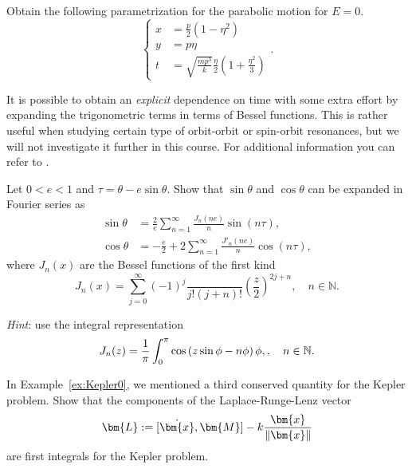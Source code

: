 \documentclass[english,fontsize=11pt,paper=a5,oneside]{scrbook}
\newcommand{\N}{\mathbb{N}}
\newcommand{\bx}{\bm{x}}
\let\d\relax
\DeclareMathOperator{\d}{d}
\theoremstyle{definition}
\newenvironment{exercise}
  {\pushQED{\qed}\renewcommand{\qedsymbol}{$\maltese$}\exercisex}
  {\popQED\endexercisex}
\begin{document}
\begin{exercise}
    Obtain the following parametrization for the parabolic motion for $E=0$.
    \begin{equation}
        \left\lbrace
        \begin{aligned}
            x &= \frac p2 \left(1- \eta^2\right)\\
            y &= p\eta\\
            t &= \sqrt{\frac{mp^3}k}\frac\eta2\left(1+\frac{\eta^2}3\right)
        \end{aligned}
        \right..
    \end{equation}
\end{exercise}

It is possible to obtain an \emph{explicit} dependence on time with some extra effort by expanding the trigonometric terms in terms of Bessel functions. This is rather useful when studying certain type of orbit-orbit or spin-orbit resonances, but we will not investigate it further in this course. For additional information you can refer to \cite{book:arnoldcelestial, book:celletti}.

\begin{exercise}
    Let $0<e<1$ and $\tau = \theta - e\sin\theta$.
    Show that $\sin\theta$ and $\cos\theta$ can be expanded in Fourier series as
    \begin{align}
        \sin\theta &= \frac2e \sum_{n=1}^\infty \frac{J_n(ne)}{n} \sin(n\tau),\\
        \cos\theta &= -\frac e2 + 2 \sum_{n=1}^\infty \frac{J'_n(ne)}{n} \cos(n\tau),
    \end{align}
    where $J_n(x)$ are the Bessel functions of the first kind 
    \begin{equation}
        J_n(x) = \sum_{j=0}^\infty (-1)^j\frac{}{j!(j+n)!}\left(\frac z2\right)^{2j+n}, \quad n\in\N.
    \end{equation}

    \emph{Hint}: use the integral representation
    \begin{equation}
        J_n(z) = \frac1\pi \int_0^\pi \cos\left(z\sin\phi - n \phi\right)\d\phi,, \quad n\in\N.
    \end{equation}
\end{exercise}

In Example~\ref{ex:Kepler0}, we mentioned a third conserved quantity for the Kepler problem.
\begin{exercise}
    Show that the components of the Laplace-Runge-Lenz vector
    \begin{equation}
        \bm{L} := [\dot \bx, \bm{M}] - k \frac{\bx}{\|\bx\|}
    \end{equation}
    are first integrals for the Kepler problem.
\end{exercise}
\end{document}
